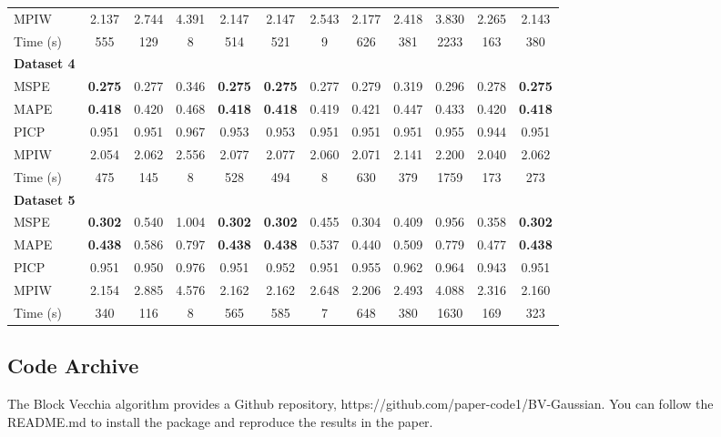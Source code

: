 \documentclass[12pt]{article}
\begin{document}
\begin{table}[ht]
{\begin{tabular}{lccccccccccc}
MPIW & {2.137} & 2.744 & 4.391 & {2.147} & {2.147} & 2.543 & {2.177} & 2.418 & 3.830 & 2.265 & {2.143}\\
Time (s) & 555 & 129 & 8 & 514 & 521 & 9 & 626 & 381 & 2233 & 163 & 380 \\ \hline
\textbf{Dataset 4} \\
MSPE & \textbf{0.275} & 0.277 & 0.346 & \textbf{0.275} & \textbf{0.275} & 0.277 & 0.279 & 0.319 & 0.296 & 0.278 & \textbf{0.275} \\
MAPE & \textbf{0.418} & 0.420 & 0.468 & \textbf{0.418} & \textbf{0.418} & 0.419 & {0.421} & 0.447 & 0.433 & 0.420 & \textbf{0.418}\\
PICP & 0.951 & 0.951 & 0.967 & 0.953 & 0.953 & 0.951 & 0.951 & 0.951 & 0.955 & 0.944 & 0.951 \\
MPIW & {2.054} & {2.062} & 2.556 & {2.077} & {2.077} & 2.060 & 2.071 & 2.141 & 2.200 & 2.040 & {2.062} \\
Time (s) & 475 & 145 & 8 & 528 & 494 & 8 & 630 & 379 & 1759 & 173 & 273\\ \hline
\textbf{Dataset 5} \\
MSPE & \textbf{0.302} & 0.540 & 1.004 & \textbf{0.302} & \textbf{0.302} & 0.455 & {0.304} & 0.409 & 0.956 & 0.358 & \textbf{0.302}\\
MAPE & \textbf{0.438} & 0.586 & 0.797 & \textbf{0.438} & \textbf{0.438} & 0.537 & 0.440 & 0.509 & 0.779  & 0.477 & \textbf{0.438}\\
PICP & 0.951 & 0.950 & 0.976 & 0.951 & 0.952 & 0.951 & 0.955 & 0.962 & 0.964 & 0.943 & 0.951 \\
MPIW & {2.154} & 2.885 & 4.576 & {2.162} & {2.162} & 2.648 & {2.206} & {2.493} & 4.088 & 2.316 & {2.160}\\
Time (s) & 340 & 116 & 8 & 565 & 585 & 7 & 648 & 380 & 1630 & 169 & 323 \\ 
\bottomrule
\end{tabular}%
}
\label{tab:comparison}
\end{table}


\newpage
\subsection*{Code Archive}

The Block Vecchia algorithm provides a Github repository, https://github.com/paper-code1/BV-Gaussian. You can follow the README.md to install the package and reproduce the results in the paper. 
\end{document}
